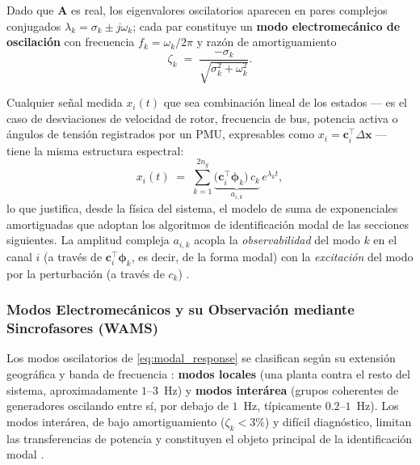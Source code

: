 Dado que $\mathbf{A}$ es real, los eigenvalores oscilatorios aparecen en
pares complejos conjugados $\lambda_k = \sigma_k \pm j\omega_k$; cada par
constituye un \textbf{modo electromecánico de oscilación} con frecuencia
$f_k = \omega_k/2\pi$ y razón de amortiguamiento
\begin{equation}
    \zeta_k \;=\; \frac{-\sigma_k}{\sqrt{\sigma_k^2 + \omega_k^2}}.
    \label{eq:damping_ratio}
\end{equation}

Cualquier señal medida $x_i(t)$ que sea combinación lineal de los estados
--- es el caso de desviaciones de velocidad de rotor, frecuencia de bus,
potencia activa o ángulos de tensión registrados por un PMU, expresables
como $x_i = \mathbf{c}_i^\top\Delta\mathbf{x}$ --- tiene la misma
estructura espectral:
\begin{equation}
    x_i(t) \;=\; \sum_{k=1}^{2n_g}
    \underbrace{\bigl(\mathbf{c}_i^\top\boldsymbol{\phi}_k\bigr)\,c_k}_{a_{i,k}}\,
    e^{\lambda_k t},
    \label{eq:measured_modal}
\end{equation}
lo que justifica, desde la física del sistema, el modelo de suma de
exponenciales amortiguadas que adoptan los algoritmos de identificación
modal de las secciones siguientes. La amplitud compleja $a_{i,k}$ acopla la
\textit{observabilidad} del modo $k$ en el canal $i$
(a través de $\mathbf{c}_i^\top\boldsymbol{\phi}_k$, es decir, de la forma
modal) con la \textit{excitación} del modo por la perturbación
(a través de $c_k$) \cite{kundur1994}.


\subsubsection{Modos Electromecánicos y su Observación mediante
Sincrofasores (WAMS)}

Los modos oscilatorios de \eqref{eq:modal_response} se clasifican según su
extensión geográfica y banda de frecuencia \cite{kundur1994,sauer2017}:
\textbf{modos locales} (una planta contra el resto del sistema,
aproximadamente $1$--$3$~Hz) y \textbf{modos interárea} (grupos coherentes
de generadores oscilando entre sí, por debajo de $1$~Hz, típicamente
$0.2$--$1$~Hz). Los modos interárea, de bajo amortiguamiento
($\zeta_k < 3\%$) y difícil diagnóstico, limitan las transferencias de
potencia y constituyen el objeto principal de la identificación modal
\cite{sauer2017}.

